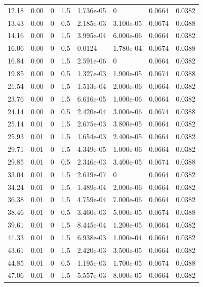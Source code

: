 \documentclass[preview]{standalone}
\begin{document}
{{\begin{tabular}{L{1.2cm}C{1.2cm} C{0.3cm}C{0.5cm} C{1.4cm}C{1.4cm} C{1.4cm}C{1.4cm}}
  12.18  &  0.00  & 0     & 1.5 &  1.736e-05  & 0  & 0.0664 &  0.0382   \\ 
  13.43  &  0.00  & 0     & 0.5 &  2.185e-03  & 3.100e-05  & 0.0674 &  0.0388   \\ 
  14.16  &  0.00  & 0     & 1.5 &  3.995e-04  & 6.000e-06  & 0.0664 &  0.0382   \\ 
  16.06  &  0.00  & 0     & 0.5 &  0.0124  & 1.780e-04  & 0.0674 &  0.0388   \\ 
  16.84  &  0.00  & 0     & 1.5 &  2.591e-06  & 0  & 0.0664 &  0.0382   \\ 
  19.85  &  0.00  & 0     & 0.5 &  1.327e-03  & 1.900e-05  & 0.0674 &  0.0388   \\ 
  21.54  &  0.00  & 0     & 1.5 &  1.513e-04  & 2.000e-06  & 0.0664 &  0.0382   \\ 
  23.76  &  0.00  & 0     & 1.5 &  6.616e-05  & 1.000e-06  & 0.0664 &  0.0382   \\ 
  24.14  &  0.00  & 0     & 0.5 &  2.420e-04  & 3.000e-06  & 0.0674 &  0.0388   \\ 
  25.14  &  0.01  & 0     & 1.5 &  2.675e-03  & 3.800e-05  & 0.0664 &  0.0382   \\ 
  25.93  &  0.01  & 0     & 1.5 &  1.654e-03  & 2.400e-05  & 0.0664 &  0.0382   \\ 
  29.71  &  0.01  & 0     & 1.5 &  4.349e-05  & 1.000e-06  & 0.0664 &  0.0382   \\ 
  29.85  &  0.01  & 0     & 0.5 &  2.346e-03  & 3.400e-05  & 0.0674 &  0.0388   \\ 
  33.04  &  0.01  & 0     & 1.5 &  2.619e-07  & 0  & 0.0664 &  0.0382   \\ 
  34.24  &  0.01  & 0     & 1.5 &  1.489e-04  & 2.000e-06  & 0.0664 &  0.0382   \\ 
  36.38  &  0.01  & 0     & 1.5 &  4.759e-04  & 7.000e-06  & 0.0664 &  0.0382   \\ 
  38.46  &  0.01  & 0     & 0.5 &  3.460e-03  & 5.000e-05  & 0.0674 &  0.0388   \\ 
  39.61  &  0.01  & 0     & 1.5 &  8.445e-04  & 1.200e-05  & 0.0664 &  0.0382   \\ 
  41.33  &  0.01  & 0     & 1.5 &  6.938e-03  & 1.000e-04  & 0.0664 &  0.0382   \\ 
  43.61  &  0.01  & 0     & 1.5 &  2.420e-03  & 3.500e-05  & 0.0664 &  0.0382   \\ 
  44.85  &  0.01  & 0     & 0.5 &  1.195e-03  & 1.700e-05  & 0.0674 &  0.0388   \\ 
  47.06  &  0.01  & 0     & 1.5 &  5.557e-03  & 8.000e-05  & 0.0664 &  0.0382   \\ 

\end{tabular}}}
\end{document}
